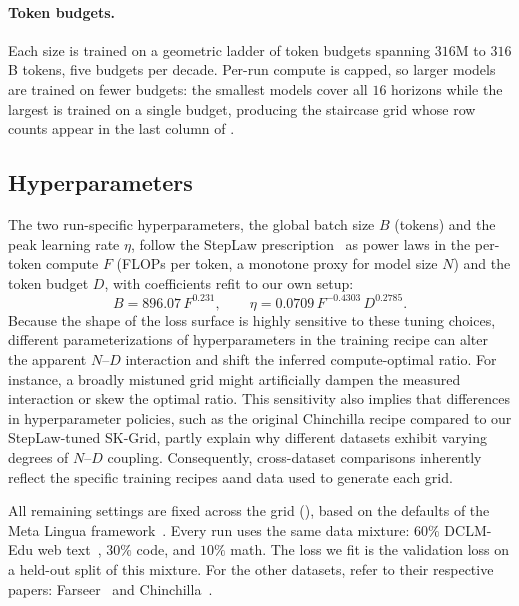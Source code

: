 \documentclass[]{fairmeta}
\begin{document}
\paragraph{Token budgets.} Each size is trained on a geometric ladder of token budgets spanning $316$M to $316$B tokens, five budgets per decade. Per-run compute is capped, so larger models are trained on fewer budgets: the smallest models cover all $16$ horizons while the largest is trained on a single budget, producing the staircase grid whose row counts appear in the last column of .

\subsection{Hyperparameters}
The two run-specific hyperparameters, the global batch size $B$ (tokens) and the peak learning rate $\eta$, follow the StepLaw prescription~\citep{li2025hyperopt} as power laws in the per-token compute $F$ (FLOPs per token, a monotone proxy for model size $N$) and the token budget $D$, with coefficients refit to our own setup:
\begin{equation}\label{eq:hp}
B = 896.07\,F^{0.231},
\qquad
\eta = 0.0709\,F^{-0.4303}\,D^{0.2785}.
\end{equation}
Because the shape of the loss surface is highly sensitive to these tuning choices, different parameterizations of hyperparameters in the training recipe can alter the apparent $N$--$D$ interaction and shift the inferred compute-optimal ratio. For instance, a broadly mistuned grid might artificially dampen the measured interaction or skew the optimal ratio. This sensitivity also implies that differences in hyperparameter policies, such as the original Chinchilla recipe compared to our StepLaw-tuned SK-Grid, partly explain why different datasets exhibit varying degrees of $N$--$D$ coupling. Consequently, cross-dataset comparisons inherently reflect the specific training recipes aand data used to generate each grid.

All remaining settings are fixed across the grid (), based on the defaults of the Meta Lingua framework~\citep{meta_lingua}. Every run uses the same data mixture: $60\%$ DCLM-Edu web text~\citep{li2024datacomp}, $30\%$ code, and $10\%$ math. The loss we fit is the validation loss on a held-out split of this mixture. For the other datasets, refer to their respective papers: Farseer~\citep{li2025predictable} and Chinchilla~\citep{besiroglu2024chinchilla,hoffmann2022training}.
\end{document}

